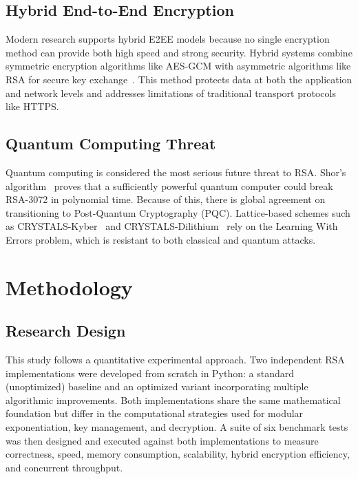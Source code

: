 \documentclass[journal]{IEEEtran}
\begin{document}
\subsection{Hybrid End-to-End Encryption}

Modern research supports hybrid E2EE models because no single encryption method can provide both high speed and strong security. Hybrid systems combine symmetric encryption algorithms like AES-GCM with asymmetric algorithms like RSA for secure key exchange~\cite{menezes2001}. This method protects data at both the application and network levels and addresses limitations of traditional transport protocols like HTTPS.

\subsection{Quantum Computing Threat}

Quantum computing is considered the most serious future threat to RSA. Shor's algorithm~\cite{shor1997} proves that a sufficiently powerful quantum computer could break RSA-3072 in polynomial time. Because of this, there is global agreement on transitioning to Post-Quantum Cryptography (PQC). Lattice-based schemes such as CRYSTALS-Kyber~\cite{kyber2023} and CRYSTALS-Dilithium~\cite{dilithium2022} rely on the Learning With Errors problem, which is resistant to both classical and quantum attacks.


\section{Methodology}
\label{sec:methodology}

\subsection{Research Design}

This study follows a quantitative experimental approach. Two independent RSA implementations were developed from scratch in Python: a standard (unoptimized) baseline and an optimized variant incorporating multiple algorithmic improvements. Both implementations share the same mathematical foundation but differ in the computational strategies used for modular exponentiation, key management, and decryption. A suite of six benchmark tests was then designed and executed against both implementations to measure correctness, speed, memory consumption, scalability, hybrid encryption efficiency, and concurrent throughput.
\end{document}
